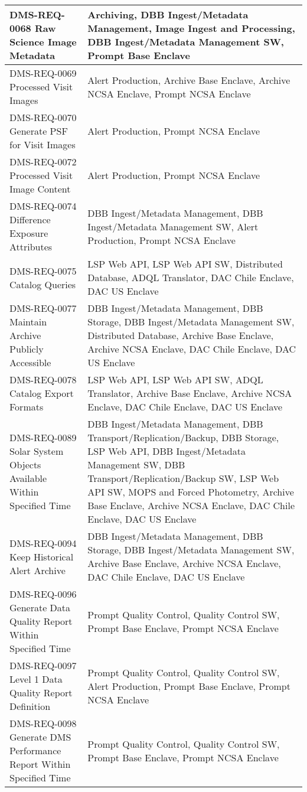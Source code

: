 \begin{longtable}{p{}p{}}
DMS-REQ-0068 Raw Science Image Metadata & Archiving, DBB Ingest/Metadata Management, Image Ingest and Processing, DBB Ingest/Metadata Management SW, Prompt Base Enclave \\ \hline
DMS-REQ-0069 Processed Visit Images & Alert Production, Archive Base Enclave, Archive NCSA Enclave, Prompt NCSA Enclave \\ \hline
DMS-REQ-0070 Generate PSF for Visit Images & Alert Production, Prompt NCSA Enclave \\ \hline
DMS-REQ-0072 Processed Visit Image Content & Alert Production, Prompt NCSA Enclave \\ \hline
DMS-REQ-0074 Difference Exposure Attributes & DBB Ingest/Metadata Management, DBB Ingest/Metadata Management SW, Alert Production, Prompt NCSA Enclave \\ \hline
DMS-REQ-0075 Catalog Queries & LSP Web API, LSP Web API SW, Distributed Database, ADQL Translator, DAC Chile Enclave, DAC US Enclave \\ \hline
DMS-REQ-0077 Maintain Archive Publicly Accessible & DBB Ingest/Metadata Management, DBB Storage, DBB Ingest/Metadata Management SW, Distributed Database, Archive Base Enclave, Archive NCSA Enclave, DAC Chile Enclave, DAC US Enclave \\ \hline
DMS-REQ-0078 Catalog Export Formats & LSP Web API, LSP Web API SW, ADQL Translator, Archive Base Enclave, Archive NCSA Enclave, DAC Chile Enclave, DAC US Enclave \\ \hline
DMS-REQ-0089 Solar System Objects Available Within Specified Time & DBB Ingest/Metadata Management, DBB Transport/Replication/Backup, DBB Storage, LSP Web API, DBB Ingest/Metadata Management SW, DBB Transport/Replication/Backup SW, LSP Web API SW, MOPS and Forced Photometry, Archive Base Enclave, Archive NCSA Enclave, DAC Chile Enclave, DAC US Enclave \\ \hline
DMS-REQ-0094 Keep Historical Alert Archive & DBB Ingest/Metadata Management, DBB Storage, DBB Ingest/Metadata Management SW, Archive Base Enclave, Archive NCSA Enclave, DAC Chile Enclave, DAC US Enclave \\ \hline
DMS-REQ-0096 Generate Data Quality Report Within Specified Time & Prompt Quality Control, Quality Control SW, Prompt Base Enclave, Prompt NCSA Enclave \\ \hline
DMS-REQ-0097 Level 1 Data Quality Report Definition & Prompt Quality Control, Quality Control SW, Alert Production, Prompt Base Enclave, Prompt NCSA Enclave \\ \hline
DMS-REQ-0098 Generate DMS Performance Report Within Specified Time & Prompt Quality Control, Quality Control SW, Prompt Base Enclave, Prompt NCSA Enclave \\ \hline

\end{longtable}
